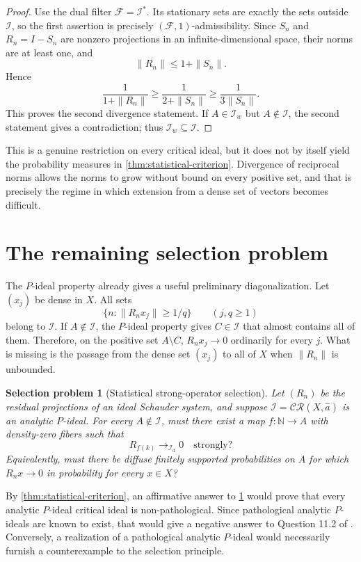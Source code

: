 \documentclass[11pt]{article}
\newtheorem{question}[theorem]{Selection problem}
\theoremstyle{definition}
\theoremstyle{remark}
\newcommand{\N}{\mathbb N}
\newcommand{\I}{\mathcal I}
\newcommand{\CR}{\mathcal{CR}}
\newcommand{\Id}{\mathcal I_{\mathrm d}}
\begin{document}
\begin{proof}
Use the dual filter $\mathcal F=\I^*$.  Its stationary sets are exactly the
sets outside $\I$, so the first assertion is precisely
$(\mathcal F,1)$-admissibility.  Since $S_n$ and $R_n=I-S_n$ are nonzero
projections in an infinite-dimensional space, their norms are at least one,
and
\[
 \|R_n\|\leq1+\|S_n\|.
\]
Hence
\[
 \frac{1}{1+\|R_n\|}
 \geq \frac{1}{2+\|S_n\|}
 \geq \frac{1}{3\|S_n\|}.
\]
This proves the second divergence statement.  If $A\in\I_w$ but
$A\notin\I$, the second statement gives a contradiction; thus
$\I_w\subseteq\I$.
\end{proof}

This is a genuine restriction on every critical ideal, but it does not by
itself yield the probability measures in \cref{thm:statistical-criterion}.
Divergence of reciprocal norms allows the norms to grow without bound on every
positive set, and that is precisely the regime in which extension from a dense
set of vectors becomes difficult.

\section{The remaining selection problem}

The $P$-ideal property already gives a useful preliminary diagonalization.
Let $(x_j)$ be dense in $X$.  All sets
\[
 \{n:\|R_nx_j\|\geq 1/q\}
 \qquad(j,q\geq1)
\]
belong to $\I$.  If $A\notin\I$, the $P$-ideal property gives $C\in\I$ that
almost contains all of them.  Therefore, on the positive set $A\setminus C$,
$R_nx_j\to0$ ordinarily for every $j$.  What is missing is the passage from
the dense set $(x_j)$ to all of $X$ when $\|R_n\|$ is unbounded.

\begin{question}[Statistical strong-operator selection]
\label{q:selection}
Let $(R_n)$ be the residual projections of an ideal Schauder system, and
suppose $\I=\CR(X,\widehat a)$ is an analytic $P$-ideal.  For every
$A\notin\I$, must there exist a map $f:\N\to A$ with density-zero fibers such
that
\[
 R_{f(k)}\longrightarrow_{\Id}0
 \quad\text{strongly}?
\]
Equivalently, must there be diffuse finitely supported probabilities on $A$
for which $R_nx\to0$ in probability for every $x\in X$?
\end{question}

By \cref{thm:statistical-criterion}, an affirmative answer to
\cref{q:selection} would prove that every analytic $P$-ideal critical ideal is
non-pathological.  Since pathological analytic $P$-ideals are known to exist,
that would give a negative answer to Question 11.2 of \cite{KS}.  Conversely,
a realization of a pathological analytic $P$-ideal would necessarily furnish
a counterexample to the selection principle.
\end{document}
